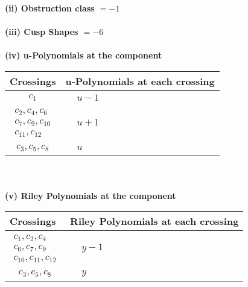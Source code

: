\documentclass[1p]{elsarticle_modified}
\theoremstyle{definition}
\begin{document}
\flushleft \textbf{(ii) Obstruction class $= -1$}\\~\\
\flushleft \textbf{(iii) Cusp Shapes $= -6$}\\~\\
\newpage\renewcommand{\arraystretch}{1}
\flushleft \textbf{(iv) u-Polynomials at the component}\newline \\
\begin{tabular}{m{50pt}|m{274pt}}
Crossings & \hspace{64pt}u-Polynomials at each crossing \\
\hline $$\begin{aligned}c_{1}\end{aligned}$$&$\begin{aligned}
&u-1
\end{aligned}$\\
\hline $$\begin{aligned}c_{2},c_{4},c_{6}\\c_{7},c_{9},c_{10}\\c_{11},c_{12}\end{aligned}$$&$\begin{aligned}
&u+1
\end{aligned}$\\
\hline $$\begin{aligned}c_{3},c_{5},c_{8}\end{aligned}$$&$\begin{aligned}
&u
\end{aligned}$\\
\hline
\end{tabular}\\~\\
\newpage\renewcommand{\arraystretch}{1}
\flushleft \textbf{(v) Riley Polynomials at the component}\newline \\
\begin{tabular}{m{50pt}|m{274pt}}
Crossings & \hspace{64pt}Riley Polynomials at each crossing \\
\hline $$\begin{aligned}c_{1},c_{2},c_{4}\\c_{6},c_{7},c_{9}\\c_{10},c_{11},c_{12}\end{aligned}$$&$\begin{aligned}
&y-1
\end{aligned}$\\
\hline $$\begin{aligned}c_{3},c_{5},c_{8}\end{aligned}$$&$\begin{aligned}
&y
\end{aligned}$\\
\hline
\end{tabular}\\~\\
\end{document}
